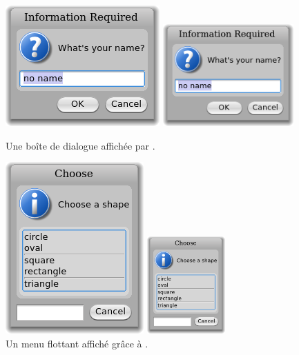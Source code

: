 \documentclass[a4paper,10pt,twoside]{book}
\begin{document}
\begin{figure}[htb]
\begin{minipage}{0.55\textwidth}
	\ifluluelse
		{\centerline{\includegraphics[scale=0.65]{dialog}}}
		{\centerline{\includegraphics[width=5cm]{dialog}}}
	\caption{Une boîte de dialogue affichée par
      .
		\label{fig:dialogName}}
\end{minipage}
\hfill
\begin{minipage}{0.38\textwidth}
	\vfill
	\ifluluelse
		{\centerline{\includegraphics [scale=0.65]{popup}}}
		{\centerline{\includegraphics[width=3cm]{popup}}}
	\vfill
	\vspace{4ex}
	\caption{Un menu flottant affiché grâce à .}
\end{minipage}
\end{figure}
\end{document}
